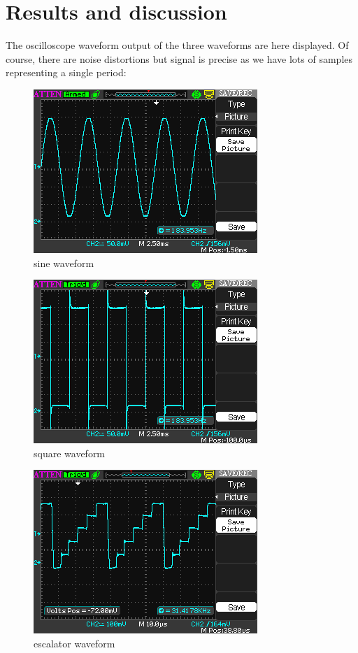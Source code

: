 \documentclass[peerreview]{IEEEtran}
\begin{document}
\section{Results and discussion}
The oscilloscope waveform output of the three waveforms are here displayed. Of course, there are noise distortions but signal is precise as we have lots of samples representing a single period:
\begin{figure}[!ht]
\centering
\includegraphics[width=0.7\columnwidth]{sine} 
\caption{sine waveform}
\label{fig_sine}
\end{figure}
\begin{figure}[!ht]
\centering
\includegraphics[width=0.7\columnwidth]{square} 
\caption{square waveform}
\label{fig_square}
\end{figure}
\begin{figure}[!ht]
\centering
\includegraphics[width=0.7\columnwidth]{escalator} 
\caption{escalator waveform}
\label{fig_escalator}
\end{figure}
\end{document}
